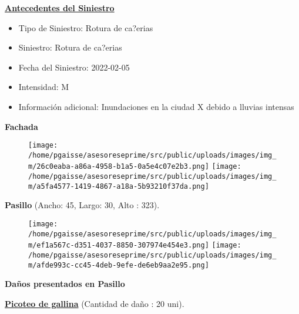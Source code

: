\documentclass{article}
\begin{document}
                        \textbf{\underline{Antecedentes del Siniestro}}\par
                        \begin{itemize}
                        \item Tipo de Siniestro: Rotura de ca?erias
                        \item Siniestro: Rotura de ca?erias
                        \item Fecha del Siniestro: 2022-02-05
                        \item Intensidad: M
                        \item Información adicional: Inundaciones en la ciudad X debido a lluvias intensas
                        \end{itemize}\begin{center}\large\textbf{Fachada}\end{center}
                        \begin{figure}[H]
                        \centering
                        \texttt{[image: /home/pgaisse/asesoreseprime/src/public/uploads/images/img\_m/26c0eaba-a86a-4958-b1a5-0a5e4c07e2b3.png]}
                        \hspace{0.5cm}
                        \texttt{[image: /home/pgaisse/asesoreseprime/src/public/uploads/images/img\_m/a5fa4577-1419-4867-a18a-5b93210f37da.png]}
                        \end{figure}\begin{center}\large\textbf{Pasillo} (Ancho: 45, Largo: 30, Alto : 323).\end{center}\par
      \par 
                    \begin{figure}[H]
                    \centering
                    \texttt{[image: /home/pgaisse/asesoreseprime/src/public/uploads/images/img\_m/ef1a567c-d351-4037-8850-307974e454e3.png]}
                    \hspace{0.5cm}
                    \texttt{[image: /home/pgaisse/asesoreseprime/src/public/uploads/images/img\_m/afde993c-cc45-4deb-9efe-de6eb9aa2e95.png]}
                    \end{figure} \begin{center}\textbf{{\large Daños presentados en Pasillo}}\end{center} \textbf{\underline{Picoteo de gallina}} (Cantidad de daño : 20 uni).\par
\end{document}
